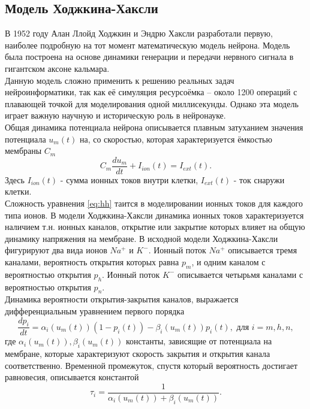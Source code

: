 \documentclass[a4paper,10pt]{article}
\begin{document}
\subsection{Модель Ходжкина-Хаксли}
	В 1952 году Алан Ллойд Ходжкин и Эндрю Хаксли разработали первую, наиболее подробную на тот момент математическую модель нейрона. Модель была построена на основе динамики генерации и передачи нервного сигнала в гигантском аксоне кальмара.\\
	\indent Данную модель сложно применить к решению реальных задач нейроинформатики, так как её симуляция ресурсоёмка -- около 1200 операций с плавающей точкой для моделирования одной миллисекунды\cite{BohteReview}. Однако эта модель играет важную научную и историческую роль в нейронауке.\\
	\indent Общая динамика потенциала нейрона описывается плавным затуханием значения потенциала $u_{m}(t)$ на, со скоростью, которая характеризуется ёмкостью мембраны $C_{m}$
	\begin{equation}\label{eq:hh}
	C_{m}\frac{du_{m}}{dt}+I_{ion}(t)=I_{ext}(t).
	\end{equation}	 
	Здесь $I_{ion}(t)$ - сумма ионных токов внутри клетки, $I_{ext}(t)$ - ток снаружи клетки.\\
	\indent Сложность уравнения \eqref{eq:hh}	 таится в моделировании ионных токов для каждого типа ионов. В модели Ходжкина-Хаксли динамика ионных токов характеризуется наличием т.н. ионных каналов, открытие или закрытие которых влияет на общую динамику напряжения на мембране. В исходной модели Ходжкина-Хаксли фигурируют два вида ионов $Na^{+}$ и $K^{-}$. Ионный поток $Na^{+}$ описывается тремя каналами, вероятность открытия которых равна $p_{m}$, и одним каналом с вероятностью открытия $p_{h}$. Ионный поток $K^{-}$ описывается четырьмя каналами с вероятностью открытия $p_{n}$\cite{Genesis}.\\ 
	\indent Динамика вероятности открытия-закрытия каналов, выражается дифференциальным уравнением первого порядка
	\begin{equation}\label{eq:hh_pch}
	\frac{dp_{i}}{dt} = \alpha_{i}(u_{m}(t))(1-p_{i}(t)) - \beta_{i}(u_{m}(t))p_{i}(t), \mbox{ для } i = m, h, n,
	\end{equation}	 
	где $\alpha_{i}(u_{m}(t)), \beta_{i}(u_{m}(t))$ константы, зависящие от потенциала на мембране, которые характеризуют скорость закрытия и открытия канала соответственно. Временной промежуток, спустя который вероятность достигает равновесия, описывается константой
	\begin{equation}\label{eq:hh_t}
	\tau_{i}=\frac{1}{\alpha_{i}(u_{m}(t))+\beta_{i}(u_{m}(t))}.	
	\end{equation}
\end{document}
